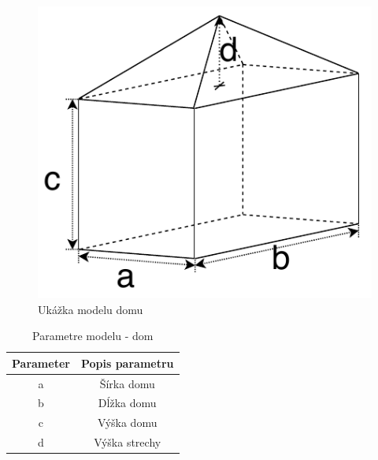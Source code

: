 \begin{minipage}[b]{\textwidth}
\begin{minipage}[b]{0.49\textwidth}
\begin{figure}[H]
	\centering
	\includegraphics[height=0.49\textwidth]{obrazky-figures/Examples/B4.pdf}
	\caption{Ukážka modelu domu}
	\label{fig:B4First}
\end{figure}
\end{minipage}
\begin{minipage}[b]{0.49\textwidth}
\begin{table}[H]
\centering
\begin{tabular}{ |c|c| }
 \hline
 Parameter & Popis parametru \\
 \hline
 \hline
 a & Šírka domu  \\ 
  \hline
 b & Dĺžka domu  \\  
  \hline
 c & Výška domu \\  
  \hline
 d & Výška strechy  \\
  \hline
\end{tabular}
\caption{Parametre modelu - dom}
 \label{tab:homeModel}
\end{table}

\end{minipage}
\end{minipage}


